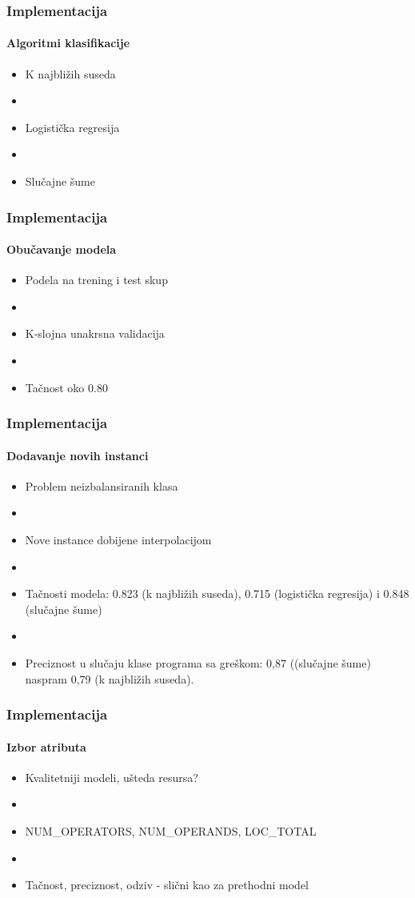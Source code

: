 \documentclass[14pt]{beamer}
\begin{document}
\begin{frame}
\frametitle{Implementacija}
\framesubtitle{Algoritmi klasifikacije}

\begin{itemize}
\item K najbližih suseda
\item[]
\item Logistička regresija
\item[]
\item Slučajne šume
\end{itemize}

\end{frame}

\begin{frame}
\frametitle{Implementacija}
\framesubtitle{Obučavanje modela}

\begin{itemize}
\item Podela na trening i test skup
\item[]
\item K-slojna unakrsna validacija
\item[]
\item Tačnost oko 0.80
\end{itemize}

\end{frame}

\begin{frame}
\frametitle{Implementacija}
\framesubtitle{Dodavanje novih instanci}

\begin{itemize}
\item Problem neizbalansiranih klasa
\item[]
\item Nove instance dobijene interpolacijom
\item[]
\item Tačnosti modela: 0.823 (k najbližih suseda), 0.715 (logistička regresija) i 0.848 (slučajne šume)
\item[]
\item Preciznost u slučaju klase programa sa greškom: 0,87 ((slučajne šume) naspram 0,79 (k najbližih suseda).
\end{itemize}

\end{frame}

\begin{frame}
\frametitle{Implementacija}
\framesubtitle{Izbor atributa}

\begin{itemize}
\item Kvalitetniji modeli, ušteda resursa?
\item[]
\item NUM\_OPERATORS, NUM\_OPERANDS, LOC\_TOTAL
\item[]
\item Tačnost, preciznost, odziv - slični kao za prethodni model
\end{itemize}

\end{frame}
\end{document}
